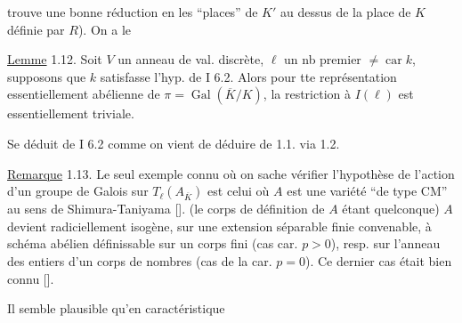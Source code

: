 trouve une bonne réduction en les  ``places'' de $K'$ au dessus de la place de $K$ définie par $R$). On a le

\uline{Lemme} 1.12. Soit $V$ un anneau de val. discrète,   $\ell$ un nb premier $\ne\operatorname{car} k$, supposons que $k$ satisfasse l'hyp. de I 6.2.  Alors pour tte représentation  essentiellement abélienne de $\pi=\operatorname{Gal}(\overline K/K)$, la restriction à $I(\ell)$ est essentiellement triviale.

Se déduit de I 6.2 comme  on vient de déduire  de 1.1. via 1.2.


\uline{Remarque} 1.13.  Le seul exemple connu où on sache vérifier l'hypothèse  de l'action   d'un groupe de Galois sur  $T_\ell(A_{\overline K})$ est celui où $A$ est une variété ``de type CM'' au sens de Shimura-Taniyama [\quad].    (le corps de définition de $A$ étant quelconque) $A$ devient radiciellement isogène, sur une extension  séparable finie convenable, à  schéma abélien définissable sur un corps fini (cas car. $p>0$), resp. sur l'anneau des entiers d'un corps de nombres (cas de la car. $p=0$). Ce dernier cas  était bien connu [\quad].

Il semble plausible qu'en caractéristique
